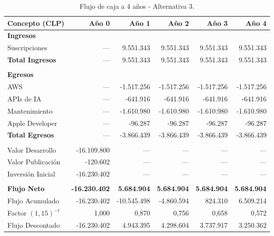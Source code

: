 \documentclass[12pt]{article}
\begin{document}
\begin{table}[h!]
    \centering
    \renewcommand{\arraystretch}{1.3}
    \footnotesize
    \begin{tabular}{|m{3.2cm}|r|r|r|r|r|}
        \hline
        \rowcolor[HTML]{EFEFEF}
        \textbf{Concepto (CLP)} & \textbf{Año 0} & \textbf{Año 1} & \textbf{Año 2} & \textbf{Año 3} & \textbf{Año 4} \\ \hline
        
        \textbf{Ingresos } &&&&&\\ \hline
        Suscripciones & --- & 9.551.343 & 9.551.343 & 9.551.343 & 9.551.343 \\ \hline
        \rowcolor[HTML]{E8F5E9}
        \textbf{Total Ingresos} & --- & 9.551.343 & 9.551.343 & 9.551.343 & 9.551.343 \\ \hline
        & & & & & \\ \hline
        \textbf{Egresos} & & & & & \\ \hline
        AWS & --- & -1.517.256 & -1.517.256 & -1.517.256 & -1.517.256 \\ \hline
        APIs de IA & --- & -641.916 & -641.916 & -641.916 & -641.916 \\ \hline
        Mantenimiento & --- & -1.610.980 & -1.610.980 & -1.610.980 & -1.610.980 \\ \hline
        Apple Developer & --- & -96.287 & -96.287 & -96.287 & -96.287 \\ \hline
        \rowcolor[HTML]{F3E5F5}
        \textbf{Total Egresos} & --- & -3.866.439 & -3.866.439 & -3.866.439 & -3.866.439 \\ \hline
        & & & & & \\ \hline
        Valor Desarrollo & -16.109.800 & --- & --- & --- & --- \\ \hline
        Valor Publicación & -120.602 & --- & --- & --- & --- \\ \hline
        \rowcolor[HTML]{F3E5F5} 
        Inversión Inicial & -16.230.402 & --- & --- & --- & --- \\ \hline
        & & & & & \\ \hline
        \rowcolor[HTML]{E8F5E9}
        \textbf{Flujo Neto} & \textbf{-16.230.402} & \textbf{5.684.904} & \textbf{5.684.904} & \textbf{5.684.904} & \textbf{5.684.904} \\ \hline
        Flujo Acumulado & -16.230.402 & -10.545.498 & -4.860.594 & 824.310 & 6.509.214 \\ \hline
        \rowcolor[HTML]{F3E5F5}
        Factor $(1{,}15)^{-t}$ & 1,000 & 0,870 & 0,756 & 0,658 & 0,572 \\ \hline
        \rowcolor[HTML]{F3E5F5}
        Flujo Descontado & -16.230.402 & 4.943.395 & 4.298.604 & 3.737.917 & 3.250.362 \\ \hline
    \end{tabular}
    \caption{Flujo de caja a 4 años - Alternativa 3.}
    \label{tab:flujo_alt3}
\end{table}
\end{document}
